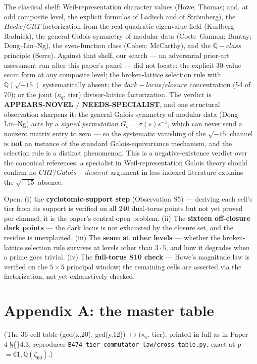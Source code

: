 \documentclass[11pt]{article}
\theoremstyle{plain}
\theoremstyle{definition}
\theoremstyle{remark}
\begin{document}
The classical shelf: Weil-representation character values (Howe; Thomas; and, at odd composite level, the explicit formulas of Ladisch and of Strömberg), the \(Hecke/CRT\) factorization from the real-quadratic eigenvalue field (Kurlberg–Rudnick), the general Galois symmetry of modular data (Coste–Gannon; Bantay; Dong–Lin–Ng), the even-function class (Cohen; McCarthy), and the \(\mathbb{Q}-class\) principle (Serre). Against that shelf, our search — an adversarial prior-art assessment run after this paper's panel — did not locate: the explicit 30-value seam form at any composite level; the broken-lattice selection rule with \(\mathbb{Q}(\sqrt{-15})\) systematically absent; the \(dark-locus/closure\) concentration (54 of 70); or the joint (\(\kappa _{q}\), tier) divisor-lattice factorization. The verdict is \textbf{APPEARS-NOVEL \(/\) NEEDS-SPECIALIST}, and one structural observation sharpens it: the general Galois symmetry of modular data (Dong–Lin–Ng) acts by a \emph{signed permutation} \(G_\sigma  = \sigma (s)s^{-1}\), which can never send a nonzero matrix entry to zero — so the systematic vanishing of the \(\sqrt{-15}\) channel is \textbf{not} an instance of the standard Galois-equivariance mechanism, and the selection rule is a distinct phenomenon. This is a negative-existence verdict over the canonical references; a specialist in Weil-representation Galois theory should confirm no \(CRT/Galois-descent\) argument in less-indexed literature explains the \(\sqrt{-15}\) absence.

Open: (i) the \textbf{cyclotomic-support step} (Observation S5) — deriving each cell's tier from its support is verified on all 240 dual-torus points but not yet proved per channel; it is the paper's central open problem. (ii) The \textbf{sixteen off-closure dark points} — the dark locus is not exhausted by the closure set, and the residue is unexplained. (iii) The \textbf{seam at other levels} — whether the broken-lattice selection rule survives at levels other than \(3\cdot 5\), and how it degrades when a prime goes trivial. (iv) The \textbf{full-torus S10 check} — Howe's magnitude law is verified on the \(5\times 5\) principal window; the remaining cells are asserted via the factorization, not yet exhaustively checked.

\section{Appendix A: the master table}

(The 36-cell table (gcd(x,20), gcd(y,12)) \(\mapsto  (\kappa _{q}\), tier), printed in full as in Paper 4 \S\{\}4.3; reproducer \texttt{B474\_tier\_commutator\_law/cross\_table.py}, exact at p \(= 61, \mathbb{Q}(\zeta _{60})\).)
\end{document}
